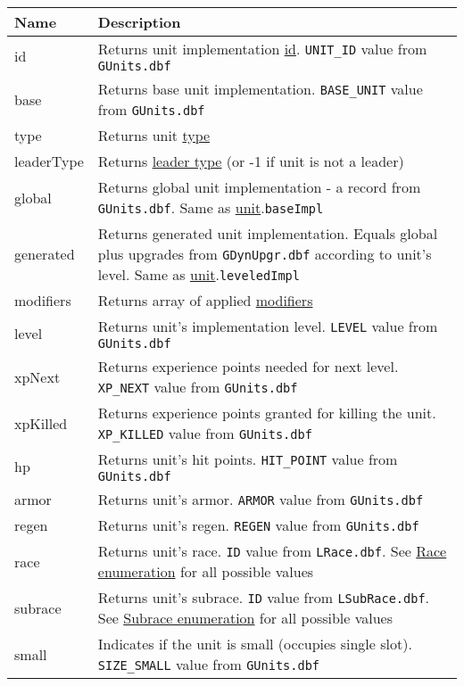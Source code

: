 \begin{center}
\begin{tabularx}{\linewidth}{| l | X |}
\hline
\textbf{Name} & \textbf{Description} \\
\hline
id & Returns unit implementation \hyperref[Id]{id}. \texttt{UNIT\_ID} value from \texttt{GUnits.dbf}\\
\hline
base & Returns base unit implementation. \texttt{BASE\_UNIT} value from \texttt{GUnits.dbf}\\
\hline
type & Returns unit \hyperref[UnitCategory]{type}\\
\hline
leaderType & Returns \hyperref[LeaderCategory]{leader type} (or -1 if unit is not a leader)\\
\hline
global & Returns global unit implementation - a record from \texttt{GUnits.dbf}. Same as \hyperref[Unit]{unit}.\texttt{baseImpl}\\
\hline
generated & Returns generated unit implementation. Equals global plus upgrades from \texttt{GDynUpgr.dbf} according to unit's level. Same as \hyperref[Unit]{unit}.\texttt{leveledImpl}\\
\hline
modifiers & Returns array of applied \hyperref[Modifier]{modifiers}\\
\hline
level & Returns unit's implementation level. \texttt{LEVEL} value from \texttt{GUnits.dbf}\\
\hline
xpNext & Returns experience points needed for next level. \texttt{XP\_NEXT} value from \texttt{GUnits.dbf}\\
\hline
xpKilled & Returns experience points granted for killing the unit. \texttt{XP\_KILLED} value from \texttt{GUnits.dbf}\\
\hline
hp & Returns unit's hit points. \texttt{HIT\_POINT} value from \texttt{GUnits.dbf}\\
\hline
armor & Returns unit's armor. \texttt{ARMOR} value from \texttt{GUnits.dbf}\\
\hline
regen & Returns unit's regen. \texttt{REGEN} value from \texttt{GUnits.dbf}\\
\hline
race & Returns unit's race. \texttt{ID} value from \texttt{LRace.dbf}. See \hyperref[RaceCategory]{Race enumeration} for all possible values\\
\hline
subrace & Returns unit's subrace. \texttt{ID} value from \texttt{LSubRace.dbf}. See \hyperref[SubraceCategory]{Subrace enumeration} for all possible values\\
\hline
small & Indicates if the unit is small (occupies single slot). \texttt{SIZE\_SMALL} value from \texttt{GUnits.dbf}\\

\end{tabularx}
\end{center}
